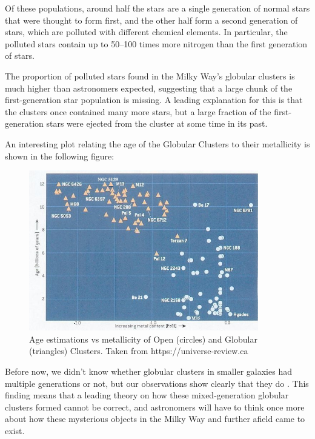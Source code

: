 Of these populations, around half the stars are a single generation of normal stars that were thought to form first, and the other half form a second generation of stars, which are polluted with different chemical elements. In particular, the polluted stars contain up to 50–100 times more nitrogen than the first generation of stars.

The proportion of polluted stars found in the Milky Way's globular clusters is much higher than astronomers expected, suggesting that a large chunk of the first-generation star population is missing. A leading explanation for this is that the clusters once contained many more stars, but a large fraction of the first-generation stars were ejected from the cluster at some time in its past.

An interesting plot relating the age of the Globular Clusters to their metallicity is shown in the following figure:

\begin{figure}[H]
\centering
\includegraphics[width=10cm]{images/metallicity_gcs.jpg}
\caption[Age vs Metallicity for some Globular Clusters]{Age estimations vs metallicity of Open (circles) and Globular (triangles) Clusters. Taken from https://universe-review.ca}
\end{figure}

Before now, we didn't know whether globular clusters in smaller galaxies had multiple generations or not, but our observations show clearly that they do \cite{15}. This finding means that a leading theory on how these mixed-generation globular clusters formed cannot be correct, and astronomers will have to think once more about how these mysterious objects in the Milky Way and further afield came to exist.

